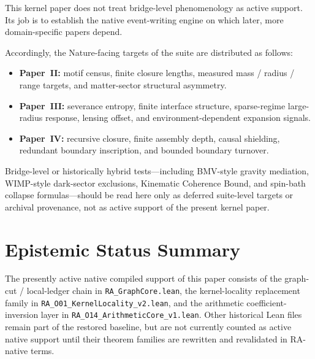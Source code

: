 \documentclass[11pt]{article}
\begin{document}
This kernel paper does not treat bridge-level phenomenology as active support. Its job is to establish the native event-writing engine on which later, more domain-specific papers depend.

Accordingly, the Nature-facing targets of the suite are distributed as follows:
\begin{itemize}
    \item \textbf{Paper~II:} motif census, finite closure lengths, measured mass / radius / range targets, and matter-sector structural asymmetry.
    \item \textbf{Paper~III:} severance entropy, finite interface structure, sparse-regime large-radius response, lensing offset, and environment-dependent expansion signals.
    \item \textbf{Paper~IV:} recursive closure, finite assembly depth, causal shielding, redundant boundary inscription, and bounded boundary turnover.
\end{itemize}

Bridge-level or historically hybrid tests---including BMV-style gravity mediation, WIMP-style dark-sector exclusions, Kinematic Coherence Bound, and spin-bath collapse formulas---should be read here only as deferred suite-level targets or archival provenance, not as active support of the present kernel paper.

\section{Epistemic Status Summary}
\label{sec:status}

\begin{tcolorbox}[title=Scope of the active native support layer,colback=gray!5,colframe=gray!60]
The presently active native compiled support of this paper consists of the graph-cut / local-ledger chain in \texttt{RA\_GraphCore.lean}, the kernel-locality replacement family in \texttt{RA\_O01\_KernelLocality\_v2.lean}, and the arithmetic coefficient-inversion layer in \texttt{RA\_O14\_ArithmeticCore\_v1.lean}. Other historical Lean files remain part of the restored baseline, but are not currently counted as active native support until their theorem families are rewritten and revalidated in RA-native terms.
\end{tcolorbox}
\end{document}

